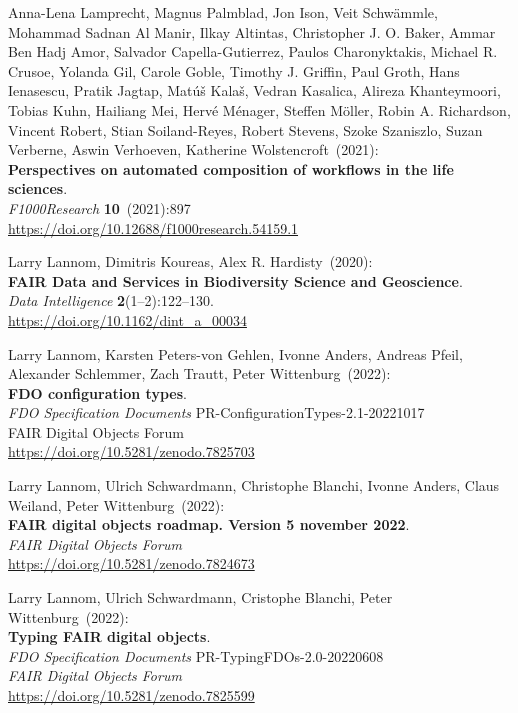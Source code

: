 \begin{thebibliography}{9}
Anna-Lena Lamprecht, Magnus Palmblad, Jon Ison, Veit Schwämmle, Mohammad
Sadnan Al Manir, Ilkay Altintas, Christopher J. O. Baker, Ammar Ben Hadj
Amor, Salvador Capella-Gutierrez, Paulos Charonyktakis, Michael R.
Crusoe, Yolanda Gil, Carole Goble, Timothy J. Griffin, Paul Groth, Hans
Ienasescu, Pratik Jagtap, Matúš Kalaš, Vedran Kasalica, Alireza
Khanteymoori, Tobias Kuhn, Hailiang Mei, Hervé Ménager, Steffen Möller,
Robin A. Richardson, Vincent Robert, Stian Soiland-Reyes, Robert
Stevens, Szoke Szaniszlo, Suzan Verberne, Aswin Verhoeven, Katherine
Wolstencroft~(2021): \\
\textbf{Perspectives on automated composition of workflows
in the life sciences}. \\
\emph{F1000Research} \textbf{10}~(2021):897 \\
\url{https://doi.org/10.12688/f1000research.54159.1}

Larry Lannom, Dimitris Koureas, Alex R. Hardisty~(2020): \\
\textbf{FAIR Data and Services in Biodiversity Science and
Geoscience}.\\
\emph{Data Intelligence} \textbf{2}(1--2):122--130.\\
\url{https://doi.org/10.1162/dint_a_00034}

Larry Lannom, Karsten Peters-von Gehlen, Ivonne Anders, Andreas Pfeil,
Alexander Schlemmer, Zach Trautt, Peter Wittenburg~(2022): \\
\textbf{{FDO} configuration types}. \\
\emph{FDO Specification Documents} PR-ConfigurationTypes-2.1-20221017 \\
FAIR Digital Objects Forum \\
\url{https://doi.org/10.5281/zenodo.7825703}

Larry Lannom, Ulrich Schwardmann, Christophe Blanchi, Ivonne Anders,
Claus Weiland, Peter Wittenburg~(2022): \\
\textbf{FAIR digital objects roadmap. Version 5 november 2022}.\\
\emph{FAIR Digital Objects Forum}\\
\url{https://doi.org/10.5281/zenodo.7824673}

Larry Lannom, Ulrich Schwardmann, Cristophe Blanchi, Peter Wittenburg~(2022): \\
\textbf{Typing {FAIR} digital objects}. \\
\emph{FDO Specification Documents} PR-TypingFDOs-2.0-20220608 \\
\emph{FAIR Digital Objects Forum}\\
\url{https://doi.org/10.5281/zenodo.7825599}


\end{thebibliography}
